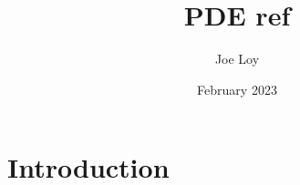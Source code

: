 \documentclass{article}
\title{PDE ref}
\author{Joe Loy}
\date{February 2023}
\begin{document}
\maketitle

\section{Introduction}
\end{document}
